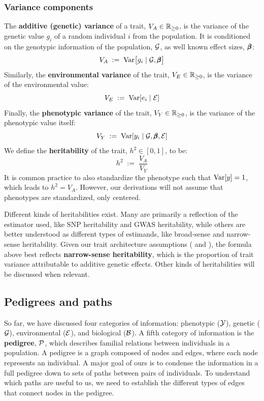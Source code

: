 \documentclass[12pt]{article}
\numberwithin{equation}{section}
\begin{document}
\subsubsection{Variance components}
The \textbf{additive (genetic) variance} of a trait, $V_A \in \mathbb{R}_{\geq 0}$, is the variance of the genetic value $g_i$ of a random individual $i$ from the population.
It is conditioned on the genotypic information of the population, $\mathcal{G}$, as well known effect sizes, $\pmb{\beta}$:
\begin{equation}\label{eq:additive-variance}
    V_A \;:=\; \mathrm{Var}\big[g_i \mid \mathcal{G}, \pmb{\beta}\big]
\end{equation}
Similarly, the \textbf{environmental variance} of the trait, $V_E \in \mathbb{R}_{\geq 0}$, is the variance of the environmental value:
\begin{equation}\label{eq:environmental-variance}
    V_E \;:=\; \mathrm{Var}[e_i \mid \mathcal{E}]
\end{equation}
Finally, the \textbf{phenotypic variance} of the trait, $V_Y \in \mathbb{R}_{\geq 0}$, is the variance of the phenotypic value itself:
\begin{equation}\label{eq:phenotypic-variance}
    V_Y \;:=\; \mathrm{Var}[y_i \mid \mathcal{G}, \pmb{\beta}, \mathcal{E}]
\end{equation}
We define the \textbf{heritability} of the trait, $h^2 \in [0,1]$, to be:
\begin{equation}\label{eq:heritability}
    h^2 \;:=\; \frac{V_A}{V_Y}
\end{equation}
It is common practice to also standardize the phenotype such that $\mathrm{Var}[y] = 1$, which leads to $h^2 = V_A$.
However, our derivations will not assume that phenotypes are standardized, only centered.

Different kinds of heritabilities exist.
Many are primarily a reflection of the estimator used, like SNP heritability and GWAS heritability, while others are better understood as different types of estimands, like broad-sense and narrow-sense heritability.
Given our trait architecture assumptions ( and ), the formula above best reflects \textbf{narrow-sense heritability}, which is the proportion of trait variance attributable to additive genetic effects.
Other kinds of heritabilities will be discussed when relevant.

\subsection{Pedigrees and paths}\label{sec:pedpath}
So far, we have discussed four categories of information: phenotypic ($\mathcal{Y}$), genetic ($\mathcal{G}$), environmental ($\mathcal{E}$), and biological ($\mathcal{B}$).
A fifth category of information is the \textbf{pedigree}, $\mathcal{P}$, which describes familial relations between individuals in a population.
A pedigree is a graph composed of nodes and edges, where each node represents an individual.
A major goal of ours is to condense the information in a full pedigree down to sets of paths between pairs of individuals.
To understand which paths are useful to us, we need to establish the different types of edges that connect nodes in the pedigree.
\end{document}
